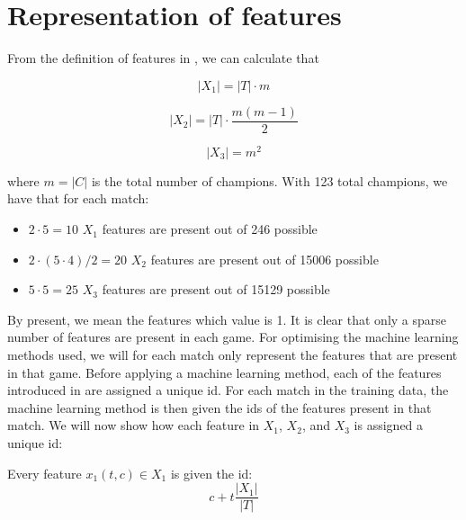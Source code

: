 
\section{Representation of features}
\label{sec:representationoffeatures}
From the definition of features in , we can calculate that

\[|X_1| = |T| \cdot m \]

\[|X_2| = |T| \cdot \frac{m(m-1)}{2} \]

\[|X_3| = m^2  \]

where $m = |C|$ is the total number of champions. With 123 total champions, we have that for each match:
\begin{itemize}
\item $2 \cdot 5 = 10$ $X_1$ features are present out of 246 possible
\item $2 \cdot (5 \cdot 4)/2 = 20$ $X_2$ features are present out of 15006 possible
\item $5 \cdot 5 = 25$ $X_3$ features are present out of 15129 possible
\end{itemize}

By present, we mean the features which value is 1.
It is clear that only a sparse number of features are present in each game. 
For optimising the machine learning methods used, we will for each match only represent the features that are present in that game. 
Before applying a machine learning method, each of the features introduced in  are assigned a unique id.
For each match in the training data, the machine learning method is then given the ids of the features present in that match.
We will now show how each feature in $X_1$, $X_2$, and $X_3$ is assigned a unique id:

\begin{center}
Every feature $x_1(t, c) \in X_1$ is given the id:
\[ c + t \frac{|X_1|}{|T|} \]
\end{center}

